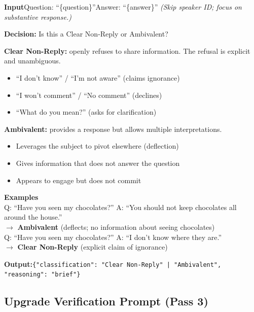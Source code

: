 \documentclass[11pt]{article}
\begin{document}
\begin{tcolorbox}[colback=passtwo!5, colframe=passtwo, fonttitle=\bfseries\footnotesize, title=Pass 2b: Clear Non-Reply $\rightarrow$ Ambivalent, breakable, boxrule=0.4pt, arc=3pt, left=5pt, right=5pt, top=3pt, bottom=3pt, fontupper=\footnotesize, before skip=6pt, after skip=6pt, toptitle=2pt, bottomtitle=2pt]
\textbf{Input}\quad Question: ``\{question\}''\quad Answer: ``\{answer\}''\quad
\textit{(Skip speaker ID; focus on substantive response.)}\smallskip

\textbf{Decision:} Is this a Clear Non-Reply or Ambivalent?\smallskip

\textbf{Clear Non-Reply:} openly refuses to share information. The refusal is explicit and unambiguous.
\begin{itemize}[leftmargin=1.5em,topsep=1pt,itemsep=0pt]
\item ``I don't know'' / ``I'm not aware'' (claims ignorance)
\item ``I won't comment'' / ``No comment'' (declines)
\item ``What do you mean?'' (asks for clarification)
\end{itemize}\smallskip

\textbf{Ambivalent:} provides a response but allows multiple interpretations.
\begin{itemize}[leftmargin=1.5em,topsep=1pt,itemsep=0pt]
\item Leverages the subject to pivot elsewhere (deflection)
\item Gives information that does not answer the question
\item Appears to engage but does not commit
\end{itemize}\smallskip

\textbf{Examples}\\
Q: ``Have you seen my chocolates?'' A: ``You should not keep chocolates all around the house.''\\
$\rightarrow$ \textbf{Ambivalent} (deflects; no information about seeing chocolates)\\
Q: ``Have you seen my chocolates?'' A: ``I don't know where they are.''\\
$\rightarrow$ \textbf{Clear Non-Reply} (explicit claim of ignorance)\smallskip

\textbf{Output:}\quad \texttt{\{"classification": "Clear Non-Reply" | "Ambivalent", "reasoning": "brief"\}}
\end{tcolorbox}

\subsection{Upgrade Verification Prompt (Pass 3)}
\end{document}
